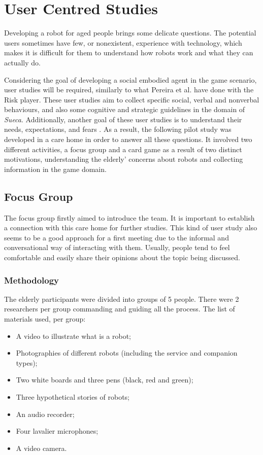 \section{User Centred Studies} \label{sec:user-studies}

Developing a robot for aged people brings some delicate questions.
The potential users sometimes have few, or nonexistent, experience with technology, which makes it is difficult for them to understand how robots work and what they can actually do.

Considering the goal of developing a social embodied agent in the game scenario, user studies will be required, similarly to what Pereira et al. have done with the Risk player.
These user studies aim to collect specific social, verbal and nonverbal behaviours, and also some cognitive and strategic guidelines in the domain of \emph{Sueca}.
Additionally, another goal of these user studies is to understand their needs, expectations, and fears \cite{Lisboa}. As a result, the following pilot study was developed in a care home in order to answer all these questions.
It involved two different activities, a focus group and a card game as a result of two distinct motivations, understanding the elderly' concerns about robots and collecting information in the game domain.





\subsection{Focus Group}
The focus group firstly aimed to introduce the team.
It is important to establish a connection with this care home for further studies.
This kind of user study also seems to be a good approach for a first meeting due to the informal and conversational way of interacting with them.
Usually, people tend to feel comfortable and easily share their opinions about the topic being discussed.

\subsubsection{Methodology}
The elderly participants were divided into groups of 5 people.
There were 2 researchers per group commanding and guiding all the process.
The list of materials used, per group:

\begin{itemize}
\item A video to illustrate what is a robot;
\item Photographies of different robots (including the service and companion types);
\item Two white boards and three pens (black, red and green);
\item Three hypothetical stories of robots;
\item An audio recorder;
\item Four lavalier microphones;
\item A video camera.
\end{itemize}

